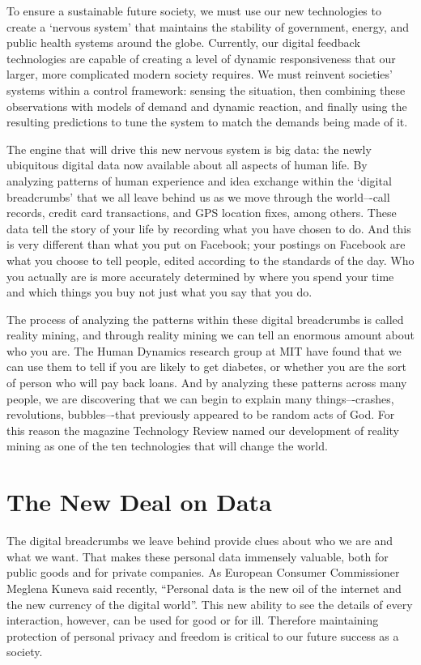 To ensure a sustainable future society, we must use our new technologies to create a `nervous system’ that maintains the stability of government, energy, and public health systems around the globe.
Currently, our digital feedback technologies are capable of creating a level of dynamic responsiveness that our larger, more complicated modern society requires.
We must reinvent societies’ systems within a control framework: sensing the situation, then combining these observations with models of demand and dynamic reaction, and finally using the resulting predictions to tune the system to match the demands being made of it.

The engine that will drive this new nervous system is big data: the newly ubiquitous digital data now available about all aspects of human life.
By analyzing patterns of human experience and idea exchange within the `digital breadcrumbs’ that we all leave behind us as we move through the world–-call records, credit card transactions, and GPS location fixes, among others.
These data tell the story of your life by recording what you have chosen to do.
And this is very different than what you put on Facebook; your postings on Facebook are what you choose to tell people, edited according to the standards of the day.
Who you actually are is more accurately determined by where you spend your time and which things you buy not just what you say that you do.

The process of analyzing the patterns within these digital breadcrumbs is called reality mining, and through reality mining we can tell an enormous amount about who you are.
The Human Dynamics research group at MIT have found that we can use them to tell if you are likely to get diabetes, or whether you are the sort of person who will pay back loans.
And by analyzing these patterns across many people, we are discovering that we can begin to explain many things–-crashes, revolutions, bubbles–-that previously appeared to be random acts of God.
For this reason the magazine Technology Review named our development of reality mining as one of the ten technologies that will change the world.

\section{The New Deal on Data}

The digital breadcrumbs we leave behind provide clues about who we are and what we want.
That makes these personal data immensely valuable, both for public goods and for private companies.
As European Consumer Commissioner Meglena Kuneva said recently, “Personal data is the new oil of the internet and the new currency of the digital world”.
This new ability to see the details of every interaction, however, can be used for good or for ill.
Therefore maintaining protection of personal privacy and freedom is critical to our future success as a society.

